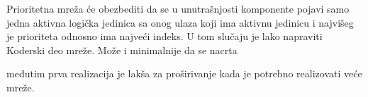 \begin{frame}[label=03-s018]
\gusttekst
Prioritetna mreža će obezbediti da se u unutrašnjosti komponente pojavi samo jedna aktivna logička jedinica sa onog ulaza koji ima aktivnu jedinicu i najvišeg je prioriteta odnosno ima najveći indeks. U tom slučaju je lako napraviti Koderski deo mreže. Može i minimalnije da se nacrta
\par\centering
\par
\raggedright
međutim prva realizacija je lakša za proširivanje kada je potrebno realizovati veće mreže.
\end{frame}

